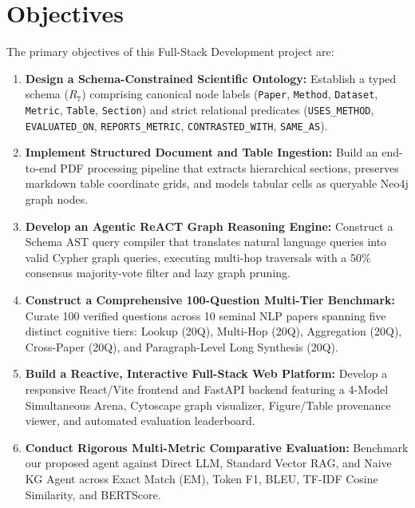 \documentclass[12pt,a4paper,oneside]{report}
\begin{document}
\section{Objectives}
The primary objectives of this Full-Stack Development project are:
\begin{enumerate}
    \item \textbf{Design a Schema-Constrained Scientific Ontology:} Establish a typed schema ($R_7$) comprising canonical node labels (\texttt{Paper}, \texttt{Method}, \texttt{Dataset}, \texttt{Metric}, \texttt{Table}, \texttt{Section}) and strict relational predicates (\texttt{USES\_METHOD}, \texttt{EVALUATED\_ON}, \texttt{REPORTS\_METRIC}, \texttt{CONTRASTED\_WITH}, \texttt{SAME\_AS}).
    \item \textbf{Implement Structured Document and Table Ingestion:} Build an end-to-end PDF processing pipeline that extracts hierarchical sections, preserves markdown table coordinate grids, and models tabular cells as queryable Neo4j graph nodes.
    \item \textbf{Develop an Agentic ReACT Graph Reasoning Engine:} Construct a Schema AST query compiler that translates natural language queries into valid Cypher graph queries, executing multi-hop traversals with a 50\% consensus majority-vote filter and lazy graph pruning.
    \item \textbf{Construct a Comprehensive 100-Question Multi-Tier Benchmark:} Curate 100 verified questions across 10 seminal NLP papers spanning five distinct cognitive tiers: Lookup (20Q), Multi-Hop (20Q), Aggregation (20Q), Cross-Paper (20Q), and Paragraph-Level Long Synthesis (20Q).
    \item \textbf{Build a Reactive, Interactive Full-Stack Web Platform:} Develop a responsive React/Vite frontend and FastAPI backend featuring a 4-Model Simultaneous Arena, Cytoscape graph visualizer, Figure/Table provenance viewer, and automated evaluation leaderboard.
    \item \textbf{Conduct Rigorous Multi-Metric Comparative Evaluation:} Benchmark our proposed agent against Direct LLM, Standard Vector RAG, and Naive KG Agent across Exact Match (EM), Token F1, BLEU, TF-IDF Cosine Similarity, and BERTScore.
\end{enumerate}
\end{document}
